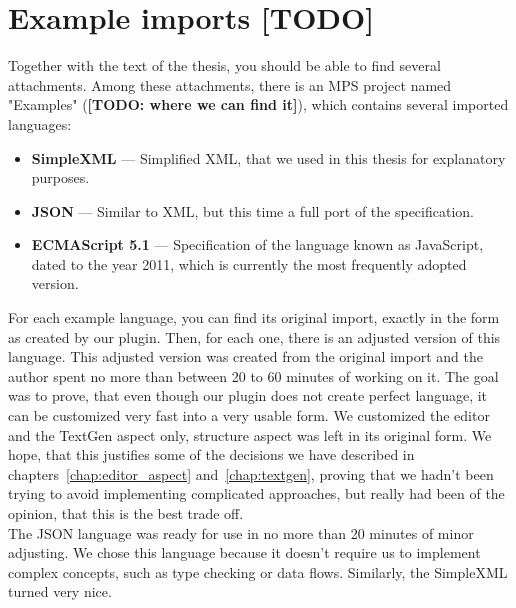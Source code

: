 \chapter{Example imports [TODO]}
\label{chap:examples}

Together with the text of the thesis, you should be able to find several attachments.
Among these attachments, there is an MPS project named "Examples" (\textbf{[TODO: where we can find it]}), which contains several imported languages:

\begin{itemize}
	\item \textbf{SimpleXML} --- Simplified XML, that we used in this thesis for explanatory purposes.
	
	\item \textbf{JSON} --- Similar to XML, but this time a full port of the specification.
	
	\item \textbf{ECMAScript 5.1} --- Specification of the language known as JavaScript, dated to the year 2011, which is currently the most frequently adopted version.
\end{itemize}

For each example language, you can find its original import, exactly in the form as created by our plugin.
Then, for each one, there is an adjusted version of this language.
This adjusted version was created from the original import and the author spent no more than between 20 to 60 minutes of working on it.
The goal was to prove, that even though our plugin does not create perfect language, it can be customized very fast into a very usable form.
We customized the editor and the TextGen aspect only, structure aspect was left in its original form.
We hope, that this justifies some of the decisions we have described in chapters~\ref{chap:editor_aspect} and~\ref{chap:textgen}, proving that we hadn't been trying to avoid implementing complicated approaches, but really had been of the opinion, that this is the best trade off.
\\

The JSON language was ready for use in no more than 20 minutes of minor adjusting.
We chose this language because it doesn't require us to implement complex concepts, such as type checking or data flows.
Similarly, the SimpleXML turned very nice.
\\

